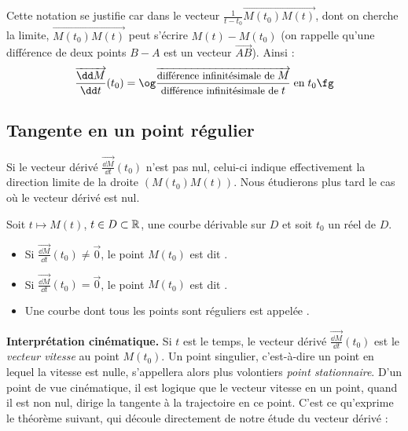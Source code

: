 \documentclass[class=report,crop=false]{standalone}
\begin{document}
Cette notation se justifie car dans le vecteur
$\frac{1}{t-t_0}\overrightarrow{M(t_0)M(t)}$,
dont on cherche la limite, $\overrightarrow{M(t_0)M(t)}$
peut s'écrire $M(t) - M(t_0)$ (on rappelle
qu'une différence de deux points $B-A$ est un vecteur $\overrightarrow{AB}$).
Ainsi :
$$\overrightarrow{\dfrac{\dd M}{\dd t}}(t_0)
=\text{\og}
\overrightarrow{\dfrac{\text{\small{différence infinitésimale de}}\;M}
{\text{\small{différence infinitésimale de}}\;t}}\;\text{en}\;t_0\text{\fg}$$


\subsection{Tangente en un point régulier}


Si le vecteur dérivé $\overrightarrow{\frac{\dd M}{\dd t}}(t_0)$ n'est pas nul,
celui-ci indique effectivement la direction limite de la droite
$(M(t_0)M(t))$. Nous étudierons plus tard le cas où le
vecteur dérivé est nul.

\begin{definition}
Soit $t\mapsto M(t)$, $t\in D\subset\mathbb{R}$, une courbe dérivable sur
$D$ et soit $t_0$ un réel de $D$.
\begin{itemize}
  \item Si $\overrightarrow{\frac{\dd M}{\dd t}}(t_0)\neq\vec{0}$,
le point $M(t_0)$ est dit .

  \item Si $\overrightarrow{\frac{\dd M}{\dd t}}(t_0)=\vec{0}$,
  le point $M(t_0)$ est dit .

  \item Une courbe dont tous les points sont réguliers est
appelée .
\end{itemize}
\end{definition}



\textbf{Interprétation cinématique.} Si $t$ est le temps,
le vecteur dérivé $\overrightarrow{\frac{\dd M}{\dd t}}(t_0)$ est
le \emph{vecteur vitesse} au point $M(t_0)$.
Un point singulier, c'est-à-dire un point en lequel
la vitesse est nulle, s’appellera alors plus volontiers
\emph{point stationnaire}.
D'un point de vue cinématique, il est logique
que le vecteur vitesse en un point, quand il est non nul,
dirige la tangente à la trajectoire en ce point.
C'est ce qu'exprime le théorème suivant, qui découle directement
de notre étude du vecteur dérivé :
\end{document}
